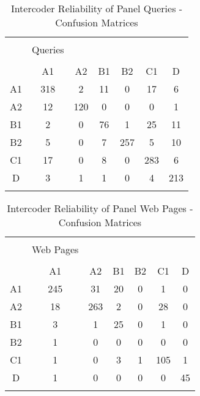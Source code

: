 \documentclass[12pt]{article}
\begin{document}
\begin{table}[!htbp] \centering 
  \caption{Intercoder Reliability of Panel Queries - Confusion Matrices} 
  \label{intercoder_queries} 
\begin{tabular}{@{\extracolsep{5pt}} ccccccc} 
\\[-1.8ex]\hline 
\hline \\[-1.8ex] 
 &   Queries & &&&& \\ 
\hline \\[-1.8ex] 
      &   A1 & A2 & B1 & B2 & C1 &  D \\
  A1 &   318 &  2 & 11 &  0 & 17 &  6\\
  A2    & 12 &120 &  0  & 0   &0 &  1\\
  B1     & 2  & 0 & 76 &  1 & 25 & 11\\
  B2    & 5  & 0 &  7& 257  & 5 & 10\\
  C1     &17  & 0 &  8  & 0& 283 &  6\\
  D     & 3 &  1 &  1 &  0 &  4& 213\\
\hline \\[-1.8ex] 
\end{tabular} 
\end{table} 

\clearpage

\begin{table}[!htbp] \centering 
  \caption{Intercoder Reliability of Panel Web Pages - Confusion Matrices} 
  \label{intercoder_webpages} 
\begin{tabular}{@{\extracolsep{5pt}} ccccccc} 
\\[-1.8ex]\hline 
\hline \\[-1.8ex] 
 &   Web Pages & &&&& \\ 
\hline \\[-1.8ex] 
      & A1 & A2 & B1 &B2 & C1 & D \\
A1 &  245&31&20& 0& 1& 0 \\
A2 &  18 & 263& 2& 0&28& 0 \\
B1 &  3& 1&25& 0& 1& 0 \\
B2 &  1& 0& 0& 0& 0& 0 \\
C1 &  1& 0& 3& 1 & 105& 1 \\
D  & 1& 0& 0& 0& 0&45 \\
\hline \\[-1.8ex] 
\end{tabular} 
\end{table} 
\end{document}

